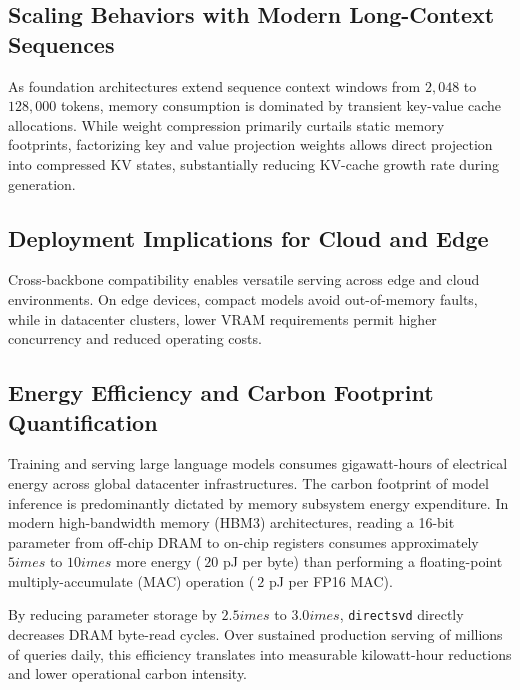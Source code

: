 \subsection{Scaling Behaviors with Modern Long-Context Sequences}
As foundation architectures extend sequence context windows from $2{,}048$ to $128{,}000$ tokens, memory consumption is dominated by transient key-value cache allocations. While weight compression primarily curtails static memory footprints, factorizing key and value projection weights allows direct projection into compressed KV states, substantially reducing KV-cache growth rate during generation.

\subsection{Deployment Implications for Cloud and Edge}
Cross-backbone compatibility enables versatile serving across edge and cloud environments. On edge devices, compact models avoid out-of-memory faults, while in datacenter clusters, lower VRAM requirements permit higher concurrency and reduced operating costs.

\subsection{Energy Efficiency and Carbon Footprint Quantification}
Training and serving large language models consumes gigawatt-hours of electrical energy across global datacenter infrastructures. The carbon footprint of model inference is predominantly dictated by memory subsystem energy expenditure. In modern high-bandwidth memory (HBM3) architectures, reading a 16-bit parameter from off-chip DRAM to on-chip registers consumes approximately $5	imes$ to $10	imes$ more energy ($~20$ pJ per byte) than performing a floating-point multiply-accumulate (MAC) operation ($~2$ pJ per FP16 MAC).

By reducing parameter storage by $2.5	imes$ to $3.0	imes$, \texttt{directsvd} directly decreases DRAM byte-read cycles. Over sustained production serving of millions of queries daily, this efficiency translates into measurable kilowatt-hour reductions and lower operational carbon intensity.
